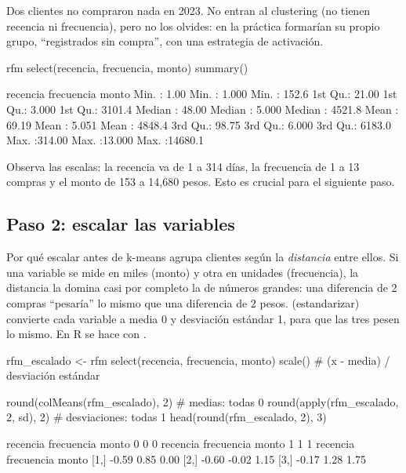 Dos clientes no compraron nada en 2023. No entran al clustering (no tienen
recencia ni frecuencia), pero no los olvides: en la práctica formarían su propio
grupo, ``registrados sin compra'', con una estrategia de activación.

\begin{rcode}
rfm %
  select(recencia, frecuencia, monto) %
  summary()
\end{rcode}

\begin{rsalida}
    recencia        frecuencia         monto        
 Min.   :  1.00   Min.   : 1.000   Min.   :  152.6  
 1st Qu.: 21.00   1st Qu.: 3.000   1st Qu.: 3101.4  
 Median : 48.00   Median : 5.000   Median : 4521.8  
 Mean   : 69.19   Mean   : 5.051   Mean   : 4848.4  
 3rd Qu.: 98.75   3rd Qu.: 6.000   3rd Qu.: 6183.0  
 Max.   :314.00   Max.   :13.000   Max.   :14680.1  
\end{rsalida}

Observa las escalas: la recencia va de 1 a 314 días, la frecuencia de 1 a 13
compras y el monto de 153 a 14{,}680 pesos. Esto es crucial para el siguiente
paso.

\subsection{Paso 2: escalar las variables}

\begin{concepto}{Por qué escalar antes de k-means}
 agrupa clientes según la \emph{distancia} entre ellos. Si una
variable se mide en miles (monto) y otra en unidades (frecuencia), la distancia
la domina casi por completo la de números grandes: una diferencia de 2 compras
``pesaría'' lo mismo que una diferencia de 2 pesos. 
(estandarizar) convierte cada variable a media 0 y desviación estándar 1, para
que las tres pesen lo mismo. En R se hace con .
\end{concepto}

\begin{rcode}
rfm_escalado <- rfm %
  select(recencia, frecuencia, monto) %
  scale()                     # (x - media) / desviación estándar

round(colMeans(rfm_escalado), 2)          # medias: todas 0
round(apply(rfm_escalado, 2, sd), 2)      # desviaciones: todas 1
head(round(rfm_escalado, 2), 3)
\end{rcode}

\begin{rsalida}
  recencia frecuencia      monto 
         0          0          0 
  recencia frecuencia      monto 
         1          1          1 
     recencia frecuencia monto
[1,]    -0.59       0.85  0.00
[2,]    -0.60      -0.02  1.15
[3,]    -0.17       1.28  1.75
\end{rsalida}

